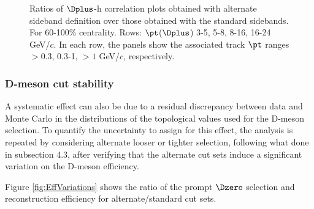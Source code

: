 \begin{figure}
 \caption{Ratios of $\Dplus$-h correlation plots obtained with alternate sideband definition over those obtained with the standard sidebands. For 60-100\% centrality. Rows: $\pt$($\Dplus$) 3-5, 5-8, 8-16, 16-24 GeV/$c$. In each row, the panels show the associated track $\pt$ ranges $> 0.3$, 0.3-1, $> 1$ GeV/$c$, respectively.}
\label{fig:SysBkg60100_Dplus}
\end{figure}

\subsubsection{D-meson cut stability}
A systematic effect can also be due to a residual discrepancy between data and Monte Carlo in the distributions of the topological values used for the D-meson selection. To quantify the uncertainty to assign for this effect, the analysis is repeated by considering alternate looser or tighter selection, following what done in subsection 4.3, after verifying that the alternate cut sets induce a significant variation on the D-meson efficiency.

Figure \ref{fig:EffVariations} shows the ratio of the prompt $\Dzero$ selection and reconstruction efficiency for alternate/standard cut sets.

